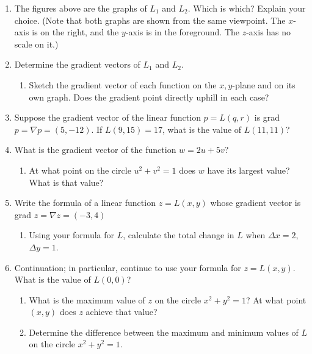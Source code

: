\begin{enumerate}
\begin{enumerate}
\end{enumerate}
\item The figures above are the graphs of $L_1$ and $L_2$.  Which is
which?  Explain your choice.  (Note that both graphs are shown from
the same viewpoint.  The $x$-axis is on the right, and the $y$-axis is
in the foreground.  The $z$-axis has no scale on it.)


\item Determine the gradient vectors of $L_1$ and $L_2$.

  \begin{enumerate}
  \item Sketch the gradient vector of each function on the $x,y$-plane
and on its own graph.  Does the gradient point directly uphill in each
case?


\end{enumerate}
\item Suppose the gradient vector of the linear function $p = L(q, r)$
is grad $p = \nabla p = (5, -12)$.  If $L(9, 15) = 17$, what is the
value of $L(11, 11)$?


\item What is the gradient vector of the function $w = 2 u + 5 v$?

  \begin{enumerate}
  \item At what point on the circle $u^2 + v^2 = 1$ does $w$ have its
largest value?  What is that value?


\end{enumerate}
\item Write the formula of a linear function $z = L(x, y)$ whose
gradient vector is grad $z = \nabla z = (-3, 4)$


  \begin{enumerate}
  \item Using your formula for $L$, calculate the total change in $L$
when $\Delta x = 2$, $\Delta y = 1$.


\end{enumerate}
\item Continuation; in particular, continue to use your formula for $z
= L(x, y)$.  What is the value of $L(0, 0)$?

  \begin{enumerate}
  \item What is the maximum value of $z$ on the circle $x^2 + y^2 = 1$?
At what point $(x, y)$ does $z$ achieve that value?

  \item Determine the difference between the maximum and minimum values
of $L$ on the circle $x^2 + y^2 = 1$.


\end{enumerate}
\end{enumerate}
